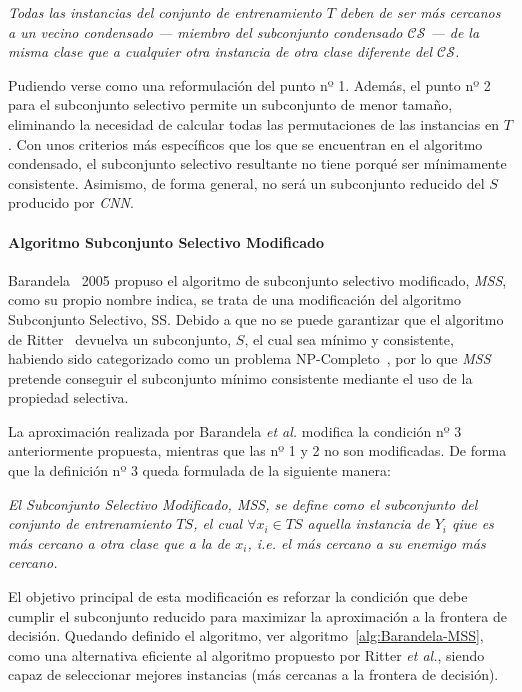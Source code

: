 \emph{Todas las instancias del conjunto de entrenamiento $T$ deben de ser más cercanos a un vecino condensado --- miembro del subconjunto condensado $\mathcal{CS}$ --- de la misma clase que a cualquier otra instancia de otra clase diferente del $\mathcal{CS}$.}

Pudiendo verse como una reformulación del punto nº 1. Además, el punto nº  2 para el subconjunto selectivo permite un subconjunto de menor tamaño, eliminando la necesidad de calcular todas las permutaciones de las instancias en $T$. Con unos criterios más específicos que los que se encuentran en el algoritmo condensado, el subconjunto selectivo resultante no tiene porqué ser mínimamente consistente. Asimismo, de forma general, no será un subconjunto reducido del $S$ producido por \textit{CNN}.


\paragraph{Algoritmo Subconjunto Selectivo Modificado}\label{paragraph:MSS}
\hfill \break
Barandela~\cite{barandela2005decision} 2005 propuso el algoritmo de subconjunto selectivo modificado, \textit{MSS}, como su propio nombre indica, se trata de una modificación del algoritmo Subconjunto Selectivo, SS. Debido a que no se puede garantizar que el algoritmo de Ritter~\cite{ritter1975algorithm} devuelva un subconjunto, $S$, el cual sea mínimo y consistente, habiendo sido categorizado como un problema NP-Completo~\cite{wilfong1992nearest}, por lo que \textit{MSS} pretende conseguir el subconjunto mínimo consistente mediante el uso de la propiedad selectiva.

La aproximación realizada por Barandela \textit{et al.} modifica la condición nº 3 anteriormente propuesta, mientras que las nº 1 y 2 no son modificadas. De forma que la definición nº 3 queda formulada de la siguiente manera:

\emph{El Subconjunto Selectivo Modificado, \textit{MSS}, se define como el subconjunto del conjunto de entrenamiento $TS$, el cual $\forall x_i \in TS$ aquella instancia de $Y_i$ qiue es más cercano a otra clase que a la de $x_i$, \textit{i.e.} el más cercano a su enemigo más cercano.}


El objetivo principal de esta modificación es reforzar la condición que debe cumplir el subconjunto reducido para maximizar la aproximación a la frontera de decisión. Quedando definido el algoritmo, ver algoritmo~\ref{alg:Barandela-MSS}, como una alternativa eficiente al algoritmo propuesto por Ritter \textit{et al.}, siendo capaz de seleccionar mejores instancias (más cercanas a la frontera de decisión). 

